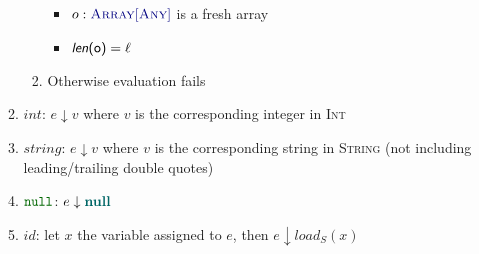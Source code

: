 \documentclass{article}
\newcommand{\terminal}[1]{\textit{#1}}
\newcommand{\vterminal}[1]{\textsf{\textcolor{dgreen}{\texttt{#1}}}}
\newcommand{\Ty}[1]{\textcolor{dblue}{#1}}
\newcommand{\TString}{\Ty{\textsc{String}}}
\newcommand{\TInt}{\Ty{\textsc{Int}}}
\newcommand{\TAny}{\Ty{\textsc{Any}}}
\newcommand{\TArrayof}[1]{\Ty{\textsc{Array}[#1]}}
\newcommand{\Vnull}[0]{\textbf{\textcolor{dcyan}{null}}}
\newcommand{\arraylength}[1]{\textsf{\textit{len}(#1)}}
\newcommand{\fail}{\textcolor{dred}{fail}}
\begin{document}
\begin{enumerate}
\begin{enumerate}
\begin{enumerate}
      \begin{itemize}
      \item $o : \TArrayof{\TAny}$ is a fresh array
      \item $\arraylength{o} = \ell$
      \end{itemize}
    \item Otherwise evaluation \fail{}s
    \end{enumerate}
  \item $\terminal{int}$:  $e \downarrow v$ where $v$ is the corresponding integer in \TInt
  \item $\terminal{string}$: $e \downarrow v$ where $v$ is the corresponding string in \TString{} (not including leading/trailing double quotes)
  \item $\vterminal{null}$: $e \downarrow \Vnull$
  \item $\terminal{id}$: let $x$ the variable assigned to $e$, then $e \downarrow \textit{load}_S(x)$
  \end{enumerate}
\end{enumerate}
\end{document}
